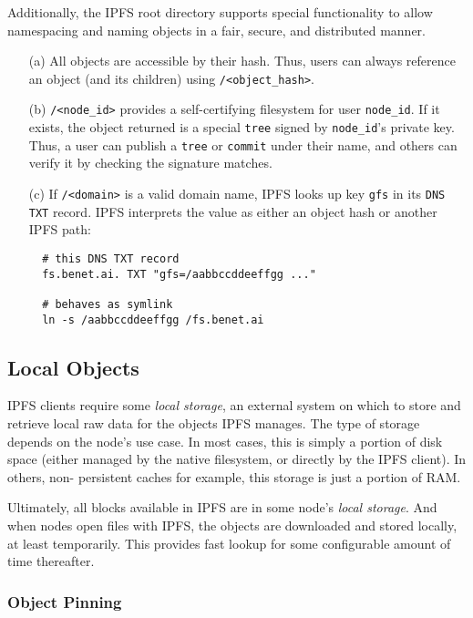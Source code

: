 \documentclass{sig-alternate}
\begin{document}
Additionally, the IPFS root directory supports special functionality to
allow namespacing and naming objects in a fair, secure, and distributed
manner.
\begin{itemize}
  \item[(a)] All objects are accessible by their hash. Thus, users can
        always reference an object (and its children) using
        \texttt{/<object\_hash>}.

  \item[(b)] \texttt{/<node\_id>} provides a self-certifying filesystem
        for user \texttt{node\_id}. If it exists, the object returned is a
        special \texttt{tree} signed by \texttt{node\_id}'s private key. Thus,
        a user can publish a \texttt{tree} or \texttt{commit} under their
        name, and others can verify it by checking the signature matches.

  \item[(c)] If \texttt{/<domain>} is a valid domain name, IPFS
        looks up key \texttt{gfs} in its \texttt{DNS TXT} record. IPFS
        interprets the value as either an object hash or another IPFS path:
        \begin{verbatim}
  # this DNS TXT record
  fs.benet.ai. TXT "gfs=/aabbccddeeffgg ..."

  # behaves as symlink
  ln -s /aabbccddeeffgg /fs.benet.ai
        \end{verbatim}

\end{itemize}


\subsection{Local Objects}

IPFS clients require some \textit{local storage}, an external system
on which to store and retrieve local raw data for the objects IPFS manages.
The type of storage depends on the node's use case.
In most cases, this is simply a portion of disk space (either managed by
the native filesystem, or directly by the IPFS client). In others, non-
persistent caches for example, this storage is just a portion of RAM.

Ultimately, all blocks available in IPFS are in some node's
\textit{local storage}. And when nodes open files with IPFS, the objects are
downloaded and stored locally, at least temporarily. This provides
fast lookup for some configurable amount of time thereafter.

\subsubsection{Object Pinning}
\end{document}
